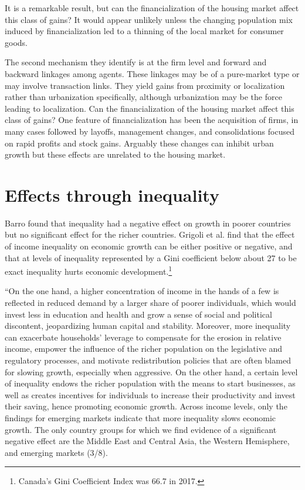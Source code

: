  It is a remarkable result, but can the financialization of the housing market affect this class of  gains? It would appear unlikely unless the changing population mix induced by financialization led to a thinning of the local market for consumer goods. 

 The second mechanism they identify is at the firm level and forward and backward linkages among agents. These linkages may be of a pure-market type or may involve transaction links. They yield  gains from proximity or localization rather than urbanization specifically, although urbanization may be the force leading to localization. Can the financialization of the housing market affect this class of  gains? One feature of financialization has been the acquisition of firms, in many cases followed by layoffs, management changes, and consolidations focused on rapid profits and stock gains. Arguably these changes can inhibit urban growth but these effects are unrelated to the housing market.
 

\section{Effects through inequality}
Barro \cite{barroInequalityGrowthInvestment1999} found that inequality had a negative effect on growth in poorer countries but no significant effect for the richer countries. Grigoli et al.\cite{grigoliInequalityGrowthHeterogeneous2016} find  that the effect of income inequality on economic growth can be either positive or negative, and that at levels  of inequality  represented by a Gini coefficient below about 27  to be exact inequality hurts economic development.\footnote{Canada's Gini Coefficient Index was 66.7 in 2017. } %

 ``On the one hand, a higher concentration of income in the hands of a few is reflected in reduced demand by a larger share of poorer individuals, which would invest less in education and health and grow a sense of social and political discontent, jeopardizing human capital and stability. Moreover, more inequality can exacerbate households’ leverage to compensate for the erosion in relative income, empower the influence of the richer population on the legislative and regulatory processes, and motivate redistribution policies that are often blamed for slowing growth, especially when aggressive. On the other hand, a certain level of inequality endows the richer population with the means to start businesses, as well as creates incentives for individuals to increase their productivity and invest their saving, hence promoting economic growth. Across income levels, only the findings for emerging markets indicate that more inequality slows economic growth. The only country groups for which we find evidence of a significant negative effect are the Middle East and Central Asia, the Western Hemisphere, and emerging markets (3/8).

